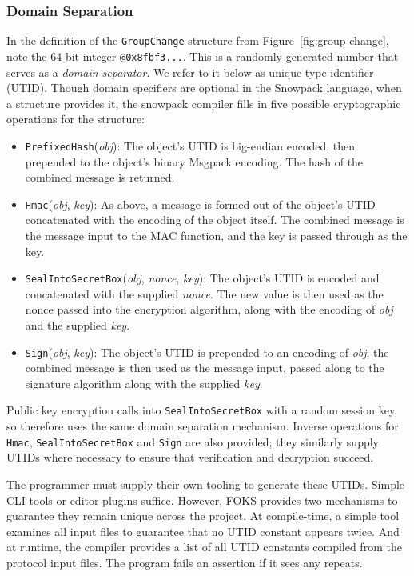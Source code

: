 \subsubsection{Domain Separation}

In the definition of the \texttt{GroupChange} structure from
Figure~\ref{fig:group-change}, note the 64-bit integer
\texttt{@0x8fbf3...}. This is a randomly-generated number that serves as
a \textit{domain separator}. We refer to it below as unique type identifier
(UTID). Though domain specifiers are optional in the Snowpack language, when a
structure provides it, the snowpack compiler fills in five possible
cryptographic operations for the structure:
%
\begin{itemize}

  \item \texttt{PrefixedHash}(\textit{obj}): The object's UTID is big-endian encoded, then
  prepended to the object's binary Msgpack encoding. The hash of the combined message is returned.

  \item \texttt{Hmac}(\textit{obj}, \textit{key}): As above, a message is formed out of the object's UTID
  concatenated with the encoding of the object itself. The combined message is the message input
  to the MAC function, and the key is passed through as the key.

  \item \texttt{SealIntoSecretBox}(\textit{obj}, \textit{nonce}, \textit{key}): The object's UTID is
  encoded and concatenated with the supplied \textit{nonce}. The new value is then used as the nonce
  passed into the encryption algorithm, along with the encoding of \textit{obj} and the supplied \textit{key}.

  \item \texttt{Sign}(\textit{obj}, \textit{key}): The object's UTID is prepended to an encoding
  of \textit{obj}; the combined message is then used as the message input, passed along to the 
  signature algorithm along with the supplied \textit{key}.

\end{itemize}
%
%
Public key encryption calls into \texttt{SealIntoSecretBox} with a random session key, so therefore uses the same
domain separation mechanism. Inverse operations for \texttt{Hmac}, \texttt{SealIntoSecretBox} and \texttt{Sign}
are also provided; they similarly supply UTIDs where necessary to ensure that verification and decryption
succeed.

The programmer must supply their own tooling to generate these UTIDs. Simple CLI tools or 
editor plugins suffice. However, FOKS provides two mechanisms to guarantee they remain unique
across the project. At compile-time, a simple tool examines all input files to guarantee that
no UTID constant appears twice. And at runtime, the compiler provides a list of all UTID constants
compiled from the protocol input files. The program fails an assertion if it sees any repeats.

